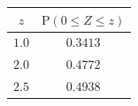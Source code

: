 {\setlength{\tabcolsep}{4pt}\renewcommand{\arraystretch}{1.3}\small%
\begin{tabular}{|c|c|}
\hline
$z$ & $\mathrm{P}(0\le Z\le z)$ \\
\hline
$1.0$ & $0.3413$ \\
\hline
$2.0$ & $0.4772$ \\
\hline
$2.5$ & $0.4938$ \\
\hline
\end{tabular}}
